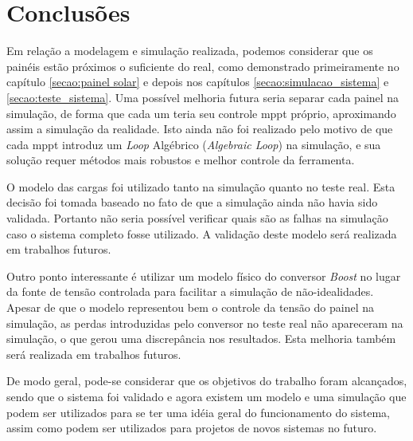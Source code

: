 \chapter{Conclusões} \label{secao:conclusoes}

Em relação a modelagem e simulação realizada, podemos considerar que os painéis estão próximos o suficiente do real, como demonstrado primeiramente no capítulo \ref{secao:painel solar} e depois nos capítulos \ref{secao:simulacao_sistema} e \ref{secao:teste_sistema}. Uma possível melhoria futura seria separar cada painel na simulação, de forma que cada um teria seu controle \gls{mppt} próprio, aproximando assim a simulação da realidade. Isto ainda não foi realizado pelo motivo de que cada \gls{mppt} introduz um \textit{Loop} Algébrico (\textit{Algebraic Loop}) na simulação, e sua solução requer métodos mais robustos e melhor controle da ferramenta.

O modelo das cargas foi utilizado tanto na simulação quanto no teste real. Esta decisão foi tomada baseado no fato de que a simulação ainda não havia sido validada. Portanto não seria possível verificar quais são as falhas na simulação caso o sistema completo fosse utilizado. A validação deste modelo será realizada em trabalhos futuros.

Outro ponto interessante é utilizar um modelo físico do conversor \textit{Boost} no lugar da fonte de tensão controlada para facilitar a simulação de não-idealidades. Apesar de que o modelo representou bem o controle da tensão do painel na simulação, as perdas introduzidas pelo conversor no teste real não apareceram na simulação, o que gerou uma discrepância nos resultados. Esta melhoria também será realizada em trabalhos futuros.

De modo geral, pode-se considerar que os objetivos do trabalho foram alcançados, sendo que o sistema foi validado e agora existem um modelo e uma simulação que podem ser utilizados para se ter uma idéia geral do funcionamento do sistema, assim como podem ser utilizados para projetos de novos sistemas no futuro.